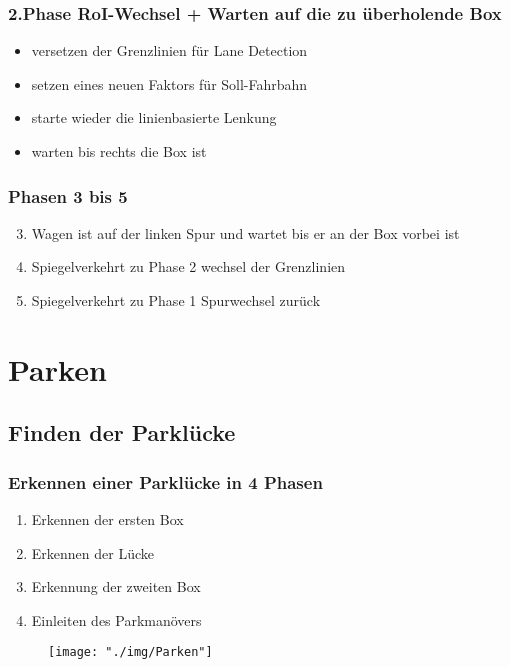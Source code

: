 \documentclass{beamer}
\begin{document}
	\begin{frame}
		\frametitle{2.Phase RoI-Wechsel + Warten auf die zu überholende Box}
		\begin{itemize}
			\item versetzen der Grenzlinien für Lane Detection
			\item setzen eines neuen Faktors für Soll-Fahrbahn
			\item starte wieder die linienbasierte Lenkung
			\item warten bis rechts die Box ist
		\end{itemize}
	\end{frame}
	
	\begin{frame}
		\frametitle{Phasen 3 bis 5}
		\begin{enumerate}
			\setcounter{enumi}{2}
			\item Wagen ist auf der linken Spur und wartet bis er an  der Box vorbei ist
			\item Spiegelverkehrt zu Phase 2 wechsel der Grenzlinien 
			\item Spiegelverkehrt zu Phase 1 Spurwechsel zurück
		\end{enumerate}
	\end{frame}
	
	\section{Parken}
	
	\subsection{Finden der Parklücke}
	
	\begin{frame}
		\frametitle{Erkennen einer Parklücke in 4 Phasen}
		
		\begin{enumerate}
			\item Erkennen der ersten Box
			\item Erkennen der Lücke
			\item Erkennung der zweiten Box
			\item Einleiten des Parkmanövers
		\end{enumerate}
		
		\begin{center}
			\begin{figure}[h]
				\texttt{[image: "./img/Parken"]}
				\label{fig:Parken1}
			\end{figure}
		\end{center}
	\end{frame}
	
\end{document}
